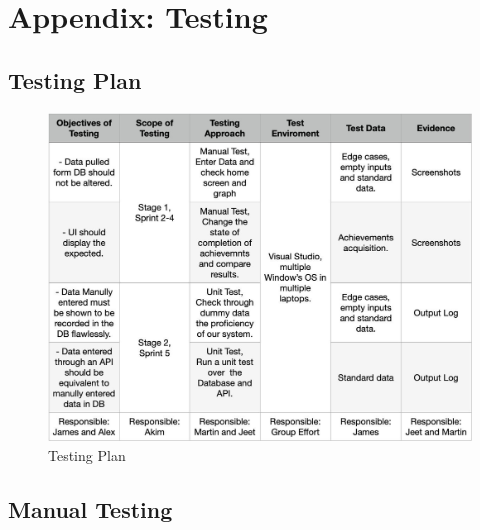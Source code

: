 \documentclass[11pt]{article}
\begin{document}
\newpage

\section{Appendix: Testing}\label{app:testing}
\subsection{Testing Plan}
\begin{figure}[!ht]
  \centering
  \includegraphics[width = 1\linewidth]{Test Design.jpg}
  \caption{Testing Plan}
    \label{fig:TestDesign}
\end{figure}
\pagebreak
\subsection{Manual Testing}
\end{document}
